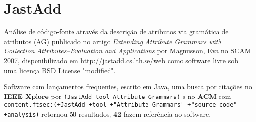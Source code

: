 \section{JastAdd}

Análise de código-fonte através da descrição de atributos via gramática de atributos (AG)
publicado no artigo {\it Extending Attribute Grammars with Collection Attributes--Evaluation and Applications}
por Magnusson, Eva
no SCAM 2007,
disponibilizado em \url{http://jastadd.cs.lth.se/web}
como software livre
sob uma licença BSD License "modified".

Software com lançamentos frequentes,
escrito em Java,
uma busca por citações no {\bf IEEE Xplore} por
\texttt{(JastAdd tool Attribute Grammars)}
e no {\bf ACM} com
\texttt{content.ftsec:(+JastAdd +tool +"Attribute Grammars" +"source code" +analysis)}
retornou
50 resultados,
{\bf 42} fazem referência ao software.

